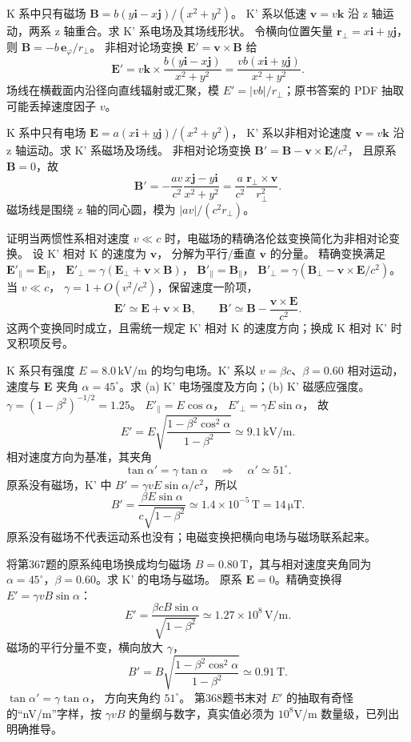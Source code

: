 K 系中只有磁场
$\bm B=b(y\bm i-x\bm j)/(x^2+y^2)$。
K' 系以低速 $\bm v=v\bm k$ 沿 z 轴运动，两系 z 轴重合。求 K' 系电场及其场线形状。
\exsolution
令横向位置矢量
$\bm r_\perp=x\bm i+y\bm j$，则
$\bm B=-b\,\bm e_\varphi/r_\perp$。
非相对论场变换
$\bm E'=\bm v\times\bm B$ 给
\[
\bm E'=v\bm k\times
\frac{b(y\bm i-x\bm j)}{x^2+y^2}
=\boxed{\frac{vb(x\bm i+y\bm j)}{x^2+y^2}}.
\]
\excheck 场线在横截面内沿径向直线辐射或汇聚，模 $E'=|vb|/r_\perp$；原书答案的 PDF 抽取可能丢掉速度因子 $v$。

K 系中只有电场
$\bm E=a(x\bm i+y\bm j)/(x^2+y^2)$，
K' 系以非相对论速度 $\bm v=v\bm k$ 沿 z 轴运动。求 K' 系磁场及场线。
\exsolution
非相对论场变换
$\bm B'=\bm B-\bm v\times\bm E/c^2$，
且原系 $\bm B=0$，故
\[
\boxed{\bm B'=
-\frac{av}{c^2}\frac{x\bm j-y\bm i}{x^2+y^2}
=\frac{a}{c^2}\frac{\bm r_\perp\times\bm v}{r_\perp^2}}.
\]
\excheck 磁场线是围绕 z 轴的同心圆，模为 $|av|/(c^2r_\perp)$。

证明当两惯性系相对速度 $v\ll c$ 时，电磁场的精确洛伦兹变换简化为非相对论变换。
\exsolution
设 K' 相对 K 的速度为 $\bm v$，
分解为平行/垂直 $\bm v$ 的分量。
精确变换满足
$\bm E'_{\parallel}=\bm E_\parallel$，
$\bm E'_\perp=\gamma(\bm E_\perp+\bm v\times\bm B)$，
$\bm B'_\parallel=\bm B_\parallel$，
$\bm B'_\perp=\gamma(\bm B_\perp-\bm v\times\bm E/c^2)$。
当 $v\ll c$，
$\gamma=1+O(v^2/c^2)$，保留速度一阶项，
\[
\boxed{\bm E'\simeq\bm E+\bm v\times\bm B},
\qquad
\boxed{\bm B'\simeq\bm B-\frac{\bm v\times\bm E}{c^2}}.
\]
\excheck 这两个变换同时成立，且需统一规定 K' 相对 K 的速度方向；换成 K 相对 K' 时叉积项反号。

K 系只有强度 $E=8.0\,\mathrm{kV/m}$ 的均匀电场。K' 系以 $v=\beta c$、$\beta=0.60$ 相对运动，速度与 $\bm E$ 夹角 $\alpha=45^\circ$。求 (a) K' 电场强度及方向；(b) K' 磁感应强度。
\exsolution
$\gamma=(1-\beta^2)^{-1/2}=1.25$。
$E'_\parallel=E\cos\alpha$，
$E'_\perp=\gamma E\sin\alpha$，
故
\[
\boxed{E'=E
\sqrt{\frac{1-\beta^2\cos^2\alpha}{1-\beta^2}}
\simeq9.1\,\mathrm{kV/m}}.
\]
相对速度方向为基准，其夹角
\[
\boxed{\tan\alpha'=\gamma\tan\alpha
\quad\Rightarrow\quad
\alpha'\simeq51^\circ}.
\]
原系没有磁场，K' 中
$B'=\gamma vE\sin\alpha/c^2$，所以
\[
\boxed{B'=\frac{\beta E\sin\alpha}
{c\sqrt{1-\beta^2}}
\simeq1.4\times10^{-5}\,\mathrm T=14\,\mathrm{\mu T}}.
\]
\excheck 原系没有磁场不代表运动系也没有；电磁变换把横向电场与磁场联系起来。

将第367题的原系纯电场换成均匀磁场 $B=0.80\,\mathrm T$，其与相对速度夹角同为 $\alpha=45^\circ$，$\beta=0.60$。求 K' 的电场与磁场。
\exsolution
原系 $\bm E=0$。精确变换得
$E'=\gamma vB\sin\alpha$：
\[
\boxed{E'=\frac{\beta c B\sin\alpha}
{\sqrt{1-\beta^2}}
\simeq1.27\times10^8\,\mathrm{V/m}}.
\]
磁场的平行分量不变，横向放大 $\gamma$，
\[
\boxed{B'=B
\sqrt{\frac{1-\beta^2\cos^2\alpha}{1-\beta^2}}
\simeq0.91\,\mathrm T}.
\]
$\tan\alpha'=\gamma\tan\alpha$，
方向夹角约 $51^\circ$。
\excheck 第368题书末对 $E'$ 的抽取有奇怪的“nV/m”字样，按 $\gamma vB$ 的量纲与数字，真实值必须为 $10^8$V/m 数量级，已列出明确推导。

